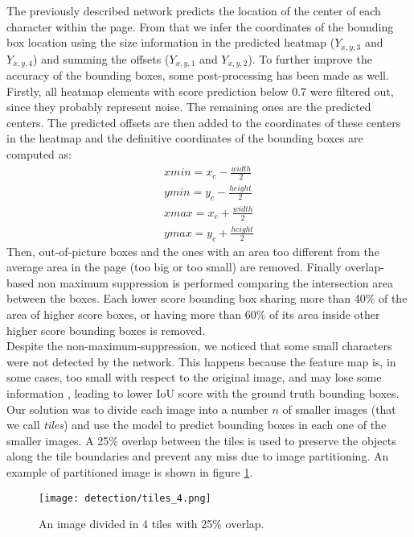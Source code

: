The previously described network predicts the location of the center of each character within the page. From that we infer the coordinates of the bounding box location using the size information in the predicted heatmap ($Y_{x,y,3}$ and $Y_{x,y,4}$) and summing the offsets ($Y_{x,y,1}$ and $Y_{x,y,2}$). To further improve the accuracy of the bounding boxes, some post-processing has been made as well. Firstly, all heatmap elements with score prediction below 0.7 were filtered out, since they probably represent noise. The remaining ones are the predicted centers. The predicted offsets are then added to the coordinates of these centers in the heatmap and the definitive coordinates of the bounding boxes are computed as:
\begin{eqnarray*}
	xmin=x_c - \frac{width}{2}\\
	ymin= y_c - \frac{height}{2}\\
	xmax=x_c + \frac{width}{2}\\
	ymax=y_c + \frac{height}{2}
\end{eqnarray*}
Then, out-of-picture boxes and the ones with an area too different from the average area in the page (too big or too small) are removed. Finally overlap-based non maximum suppression is performed comparing the intersection area between the boxes. Each lower score bounding box sharing more than 40\% of the area of higher score boxes, or having more than 60\% of its area inside other higher score bounding boxes is removed.\\

\noindent Despite the non-maximum-suppression, we noticed that some small characters were not detected by the network. This happens because the feature map is, in some cases, too small with respect to the original image, and may lose some information \cite{Ozge-Unel2019-jl}, leading to lower IoU score with the ground truth bounding boxes.
Our solution was to divide each image into a number $n$ of smaller images (that we call \textit{tiles}) and use the model to predict bounding boxes in each one of the smaller images. A 25\% overlap between the tiles is used to preserve the objects along the tile boundaries and prevent any miss due to image partitioning. An example of partitioned image is shown in figure \ref{fig:tiles4}.

\begin{figure}
	\centering
	\texttt{[image: detection/tiles\_4.png]}
	\caption{An image divided in 4 tiles with 25\% overlap.}
	\label{fig:tiles4}
\end{figure}

